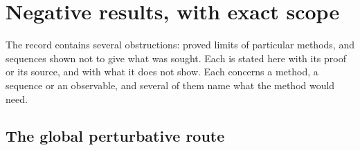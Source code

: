 \section{Negative results, with exact scope}\label{sec:negative}

The record contains several obstructions: proved limits of particular methods, and sequences shown not to give what was sought. Each is stated here with its proof or its source, and with what it does not show. Each concerns a method, a sequence or an observable, and several of them name what the method would need.

\subsection{The global perturbative route}

